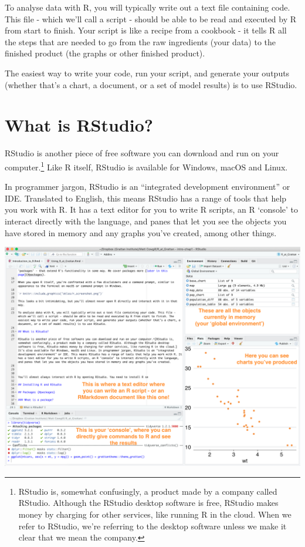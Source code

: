 \documentclass[
]{book}
\begin{document}
To analyse data with R, you will typically write out a text file containing code. This file - which we'll call a script - should be able to be read and executed by R from start to finish. Your script is like a recipe from a cookbook - it tells R all the steps that are needed to go from the raw ingredients (your data) to the finished product (the graphs or other finished product).

The easiest way to write your code, run your script, and generate your outputs (whether that's a chart, a document, or a set of model results) is to use RStudio.

\hypertarget{what-is-rstudio}{%
\section{What is RStudio?}\label{what-is-rstudio}}

RStudio is another piece of free software you can download and run on your computer.\footnote{RStudio is, somewhat confusingly, a product made by a company called RStudio. Although the RStudio desktop software is free, RStudio makes money by charging for other services, like running R in the cloud. When we refer to RStudio, we're referring to the desktop software unless we make it clear that we mean the company.} Like R itself, RStudio is available for Windows, macOS and Linux.

In programmer jargon, RStudio is an ``integrated development environment'' or IDE. Translated to English, this means RStudio has a range of tools that help you work with R. It has a text editor for you to write R scripts, an R `console' to interact directly with the language, and panes that let you see the objects you have stored in memory and any graphs you've created, among other things.

\includegraphics[width=18.4in]{atlas/rstudio_screenshot}
\end{document}
